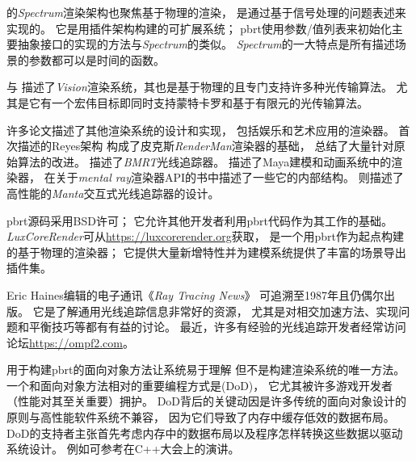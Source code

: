 \citet{glassner1993spectrum}的\emph{Spectrum}渲染架构也聚焦基于物理的渲染，
是通过基于信号处理的问题表述来实现的。
它是用插件架构构建的可扩展系统；
pbrt使用参数/值列表来初始化主要抽象接口的实现的方法与\emph{Spectrum}的类似。
\emph{Spectrum}的一大特点是所有描述场景的参数都可以是时间的函数。

\citet{468387,10.1007/978-3-7091-7484-5_6}与\citet{slusallek1996vision}
描述了\emph{Vision}渲染系统，其也是基于物理的且专门支持许多种光传输算法。
尤其是它有一个宏伟目标即同时支持蒙特卡罗和基于有限元的光传输算法。

许多论文描述了其他渲染系统的设计和实现，
包括娱乐和艺术应用的渲染器。
\citet{10.1145/37401.37414}首次描述的Reyes架构
构成了皮克斯\emph{RenderMan}渲染器的基础，
\citet{10.5555/555371}
总结了大量针对原始算法的改进。
\citet{doi:10.1080/10867651.1996.10487462}描述了\emph{BMRT}光线追踪器。
\citet{732097}描述了Maya建模和动画系统中的渲染器，
\citet{10.5555/863712}
在关于\emph{mental ray}渲染器API的书中描述了一些它的内部结构。
\citet{4061561}则描述了高性能的\emph{Manta}交互式光线追踪器的设计。

pbrt源码采用BSD许可；
它允许其他开发者利用pbrt代码作为其工作的基础。
\emph{LuxCoreRender}可从\url{https://luxcorerender.org}获取，
是一个用pbrt作为起点构建的基于物理的渲染器；
它提供大量新增特性并为建模系统提供了丰富的场景导出插件集。

Eric Haines编辑的电子通讯《\emph{Ray Tracing News}》
可追溯至1987年且仍偶尔出版。
它是了解通用光线追踪信息非常好的资源，
尤其是对相交加速方法、实现问题和平衡技巧等都有有益的讨论。
最近，许多有经验的光线追踪开发者经常访问论坛\url{https://ompf2.com}。

用于构建pbrt的面向对象方法让系统易于理解
但不是构建渲染系统的唯一方法。
一个和面向对象方法相对的重要编程方式是(DoD)，
它尤其被许多游戏开发者（性能对其至关重要）拥护。
DoD背后的关键动因是许多传统的面向对象设计的原则与高性能软件系统不兼容，
因为它们导致了内存中缓存低效的数据布局。
DoD的支持者主张首先考虑内存中的数据布局以及程序怎样转换这些数据以驱动系统设计。
例如可参考\citet{acton_2014}在C++大会上的演讲。